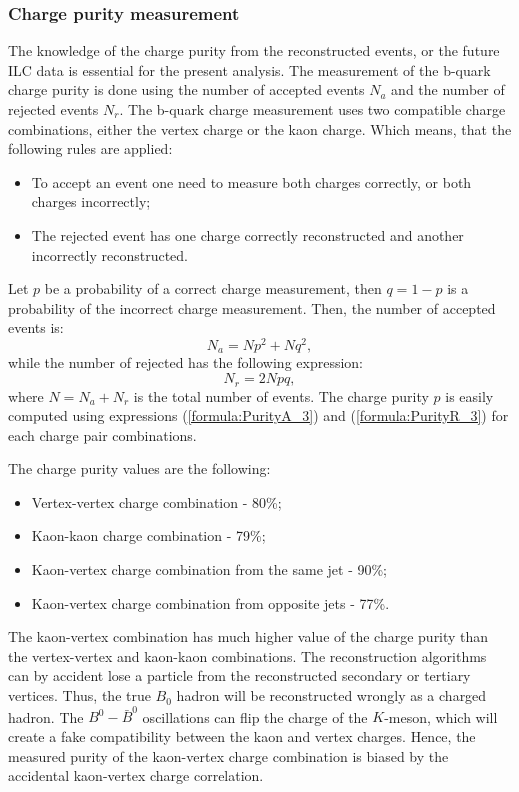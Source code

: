 \subsubsection{Charge purity measurement}
\label{sec:ChargePurity}
The knowledge of the charge purity from the reconstructed events, or the future ILC data is essential for the present analysis. 
The measurement of the b-quark charge purity is done using the number of accepted events $N_a$ and the number of rejected events $N_r$. 
The b-quark charge measurement uses two compatible charge combinations, either the vertex charge or the kaon charge.
 Which means, that the following rules are applied:
\begin{itemize}
	\item To accept an event one need to measure both charges correctly, or both charges incorrectly;
	\item The rejected event has one charge correctly reconstructed and another incorrectly reconstructed. 
\end{itemize}

Let $p$ be a probability of a correct charge measurement, then $q = 1-p$ is a probability of the incorrect charge measurement. 
Then, the number of accepted events is:
\begin{equation}
	N_a = N p^2 + N q^2,
	\label{formula:PurityA_3}
\end{equation}
while the number of rejected has the following expression:
\begin{equation}
	N_r = 2N pq,
	\label{formula:PurityR_3}
\end{equation}
where $N = N_a + N_r$ is the total number of events.
The charge purity $p$ is easily computed using expressions (\ref{formula:PurityA_3}) and (\ref{formula:PurityR_3}) for each charge pair combinations.

The charge purity values are the following:
\begin{itemize}
	\item Vertex-vertex charge combination - 80\%;
	\item Kaon-kaon charge combination  - 79\%;
	\item Kaon-vertex charge combination from the same jet - 90\%;
	\item Kaon-vertex charge combination from opposite jets - 77\%.
\end{itemize}
The kaon-vertex combination has much higher value of the charge purity than the vertex-vertex and kaon-kaon combinations. 
The reconstruction algorithms can by accident lose a particle from the reconstructed secondary or tertiary vertices. 
Thus, the true $B_0$ hadron will be reconstructed wrongly as a charged hadron.
The $B^0-\bar{B}^0$ oscillations can flip the charge of the $K$-meson, which will create a fake compatibility between the kaon and vertex charges.
Hence, the measured purity of the kaon-vertex charge combination is biased by the accidental kaon-vertex charge correlation.

